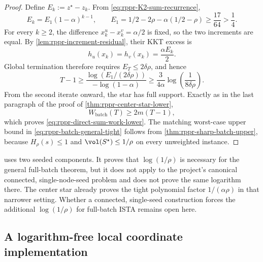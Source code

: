 \begin{proof}
Define \(E_k:=z^\star-z_k\).  From
\cref{eq:rppr-K2-sum-recurrence},
\begin{equation}
    E_k=E_1(1-\alpha)^{k-1},
    \qquad
    E_1=1/2-2\rho-\alpha(1/2-\rho)
    \geq\frac{17}{64}>\frac14.
    \label{eq:rppr-K2-error}
\end{equation}
For every \(k\geq2\), the difference
\(x_k^{u}-x_k^{v}=\alpha/2\) is fixed, so the two increments are
equal.
By \cref{lem:rppr-increment-residual}, their KKT excess is
\begin{equation}
    h_u(x_k)=h_v(x_k)
    =\frac{\alpha E_k}{2}.
    \label{eq:rppr-K2-excess}
\end{equation}
Global termination therefore requires \(E_T\leq2\delta\rho\), and hence
\begin{equation}
    T-1
    \geq
    \frac{\log(E_1/(2\delta\rho))}{-\log(1-\alpha)}
    \geq
    \frac{3}{4\alpha}
    \log\left(\frac{1}{8\delta\rho}\right).
    \label{eq:rppr-direct-sum-iteration-lower}
\end{equation}
From the second iterate onward, the star has full support.  Exactly as in the
last paragraph of the proof of \cref{thm:rppr-center-star-lower},
\[
    W_{\mathrm{batch}}(T)
    \geq2m(T-1),
\]
which proves \cref{eq:rppr-direct-sum-work-lower}.  The matching worst-case
upper bound in \cref{eq:rppr-batch-general-tight} follows from
\cref{thm:rppr-sharp-batch-upper}, because
\(H_\rho(s)\leq1\) and \(\vol(S^\star)\leq1/\rho\) on every unweighted
instance.
\end{proof}

\begin{remark}
\label{rem:rppr-connected-single-seed-open}
 uses two seeded components.  It proves that
\(\log(1/\rho)\) is necessary for the general full-batch theorem, but it does
not apply to the project's canonical connected, single-node-seed problem and
does not prove the same logarithm there.
The center star already proves the tight polynomial factor
\(1/(\alpha\rho)\) in that narrower setting.  Whether a connected,
single-seed construction forces the additional \(\log(1/\rho)\) for
full-batch ISTA remains open here.
\end{remark}

\subsection{A logarithm-free local coordinate implementation}
\label{subsec:rppr-threshold-coordinate}

